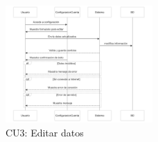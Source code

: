 \begin{figure}[h]
    \centering
    \includegraphics[width=0.5\textwidth]{img/cu3.png} %
    \caption{CU3: Editar datos}
    \label{fig: 1}
\end{figure}




